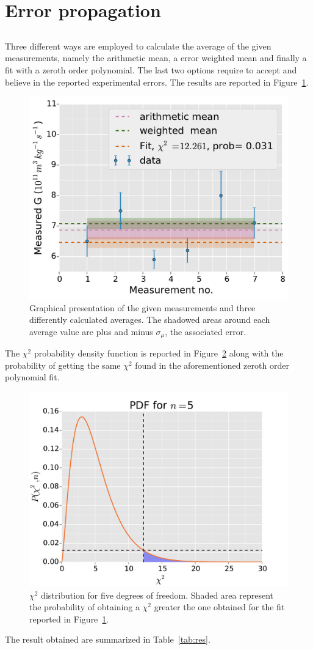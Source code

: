 \documentclass[twocolumn]{article}
\begin{document}
\clearpage
\section{Error propagation} %
\label{sec:error_propagation}
	\subsection{} %
	\label{sub:gravity}
		Three different ways are employed to calculate the average of the given measurements, namely the arithmetic mean, a error weighted mean and finally a fit with a zeroth order polynomial.
		The last two options require to accept and believe in the reported experimental errors.
		The results are reported in Figure~\ref{fig:g}.

		\begin{figure}[h!]
			\begin{center}
				\includegraphics[width=.4\textwidth]{fig/g.pdf}
			\end{center}
			\caption{Graphical presentation of the given measurements and three differently calculated averages. The shadowed areas around each average value are plus and minus $\sigma_{\mu}$, the associated error.}
			\label{fig:g}
		\end{figure}

		The $\chi ^2 $ probability density function is reported in Figure~\ref{fig:xpdf} along with the probability of getting the same $\chi ^2 $ found in the aforementioned zeroth order polynomial fit.

		\begin{figure}[h!]
			\begin{center}
				\includegraphics[width=.4 \textwidth]{fig/xpdf.pdf}
			\end{center}
			\caption{$\chi^2$ distribution for five degrees of freedom. Shaded area represent the probability of obtaining a $\chi^2$ greater the one obtained for the fit reported in Figure~\ref{fig:g}.}
			\label{fig:xpdf}
		\end{figure}
		The result obtained are summarized in Table~\ref{tab:res}.
\end{document}
